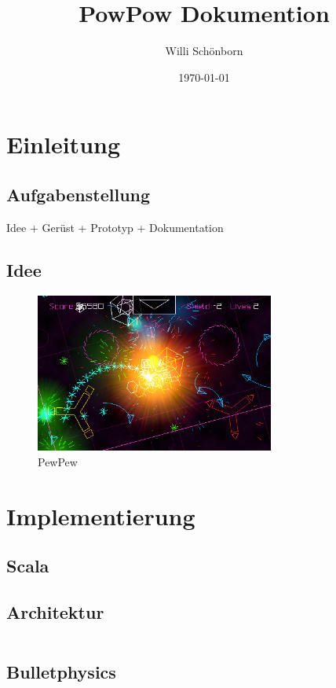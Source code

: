 \documentclass[a4paper]{article}
\title{PowPow Dokumention}
\author{Willi Schönborn}
\date{\today}
\begin{document}
\maketitle

\newpage
\tableofcontents

\newpage
\section{Einleitung}

\subsection{Aufgabenstellung}
Idee + Gerüst + Prototyp + Dokumentation

\subsection{Idee}
\begin{figure}[H]
\centering
\includegraphics[width=0.7\textwidth]{PewPew-iPhone-App-Review.jpg}
\caption{PewPew}
\end{figure}

\newpage
\section{Implementierung}

\subsection{Scala}

\subsection{Architektur}
\inputminted[firstline=20, lastline=36]{scala}{../scala/org/whiskeysierra/powpow/Ship.scala}
\subsection{Bulletphysics}
\end{document}
